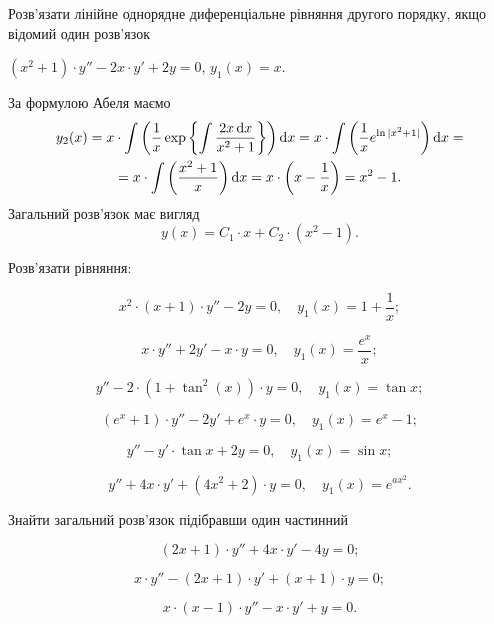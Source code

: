 Розв’язати лінійне однорядне диференціальне рівняння другого порядку, якщо відомий один розв’язок

\begin{example}
	$(x^2 + 1) \cdot y'' - 2 x \cdot y' + 2 y = 0$, $y_1(x) = x$.
\end{example}
\begin{solution}
	За формулою Абеля маємо
	\begin{multline*}
		y_2(x) = x \cdot \int \left(\frac{1}{x} \exp \left\{ \int \frac{2x\mathop{}\!\mathrm{d} x}{x^2+1} \right\} \right) \mathop{}\!\mathrm{d} x = x \cdot \int \left(\frac{1}{x} e^{\ln |x^2 + 1|} \right) \mathop{}\!\mathrm{d} x = \\ = x \cdot \int \left(\frac{x^2 + 1}{x} \right) \mathop{}\!\mathrm{d} x = x \cdot \left( x - \frac1x \right) = x^2 - 1.
	\end{multline*}
	Загальний розв’язок має вигляд \[ y(x) = C_1 \cdot x + C_2 \cdot (x^2 - 1).\]
\end{solution}

Розв’язати рівняння: 
\begin{problem}
	\[x^2\cdot(x+1)\cdot y''-2y=0,\quad y_1(x)=1+\frac1x;\]
\end{problem}
\begin{problem}
	\[x\cdot y''+2y'-x\cdot y=0,\quad y_1(x)=\frac{e^x}{x};\]
\end{problem}
\begin{problem}
	\[y''-2\cdot(1+\tan^2(x))\cdot y=0,\quad y_1(x)=\tan x;\]
\end{problem}
\begin{problem}
	\[(e^x+1)\cdot y''-2y'+e^x\cdot y=0,\quad y_1(x)=e^x-1;\]
\end{problem}
\begin{problem}
	\[y''-y'\cdot\tan x+2y=0,\quad y_1(x)=\sin x;\]
\end{problem}
\begin{problem}
	\[y''+4x\cdot y'+(4x^2+2)\cdot y=0,\quad y_1(x)=e^{a x^2}.\]
\end{problem}

Знайти загальний розв’язок підібравши один частинний
\begin{problem}
	\[(2x+1)\cdot y''+4x\cdot y'-4y=0;\]
\end{problem}
\begin{problem}
	\[x\cdot y''-(2x+1)\cdot y'+(x+1)\cdot y=0;\]
\end{problem}
\begin{problem}
	\[x\cdot(x-1)\cdot y''-x\cdot y'+y=0.\]
\end{problem}